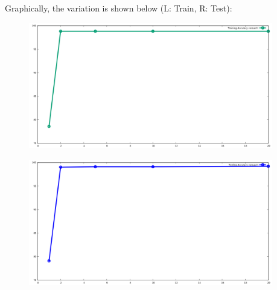 \documentclass{article}
\begin{document}
\begin{flushleft}
Graphically, the variation is shown below (L: Train, R: Test):
\begin{minipage}{0.49\linewidth}
\begin{figure}[H]
\centering
\includegraphics[width=0.95\textwidth]{train_H_BCE.png}
\end{figure}
\end{minipage}
\hfill
\begin{minipage}{0.49\linewidth}
\begin{figure}[H]
\centering
\includegraphics[width=0.95\textwidth]{test_H_BCE.png}
\end{figure}
\end{minipage}
\end{flushleft}
\end{document}

